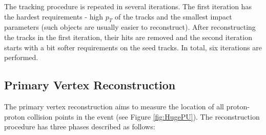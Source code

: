 The tracking procedure is repeated in several iterations.
The first iteration has the hardest requirements - high $p_{T}$ of the tracks
and the smallest impact parameters (such objects are usually easier to reconstruct). After reconstructing the tracks in the first iteration,
their hits are removed and the second iteration starts with a bit softer requirements on the seed tracks. In total, six iterations are performed.
% 

\subsection{Primary Vertex Reconstruction}\label{ssec:vtxReco}

The primary vertex reconstruction aims to measure the location of all proton-proton collision points in the event (see Figure \ref{fig:HugePU}). The reconstruction procedure has three
phases described as follows\cite{Chatrchyan:2014fea}:

